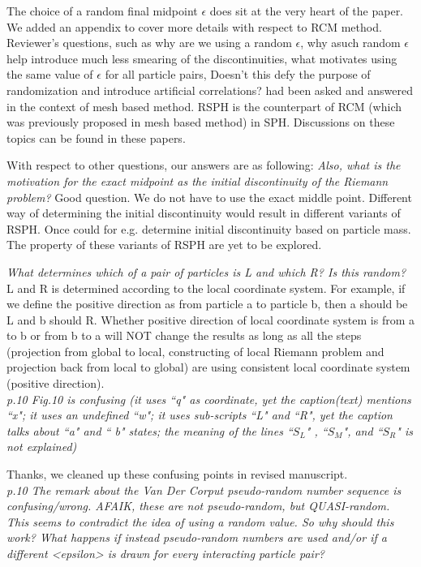 \documentclass[10pt,a4paper]{article}
\begin{document}
The choice of a random final midpoint $\epsilon$ does sit at the very heart of the paper. We added an appendix to cover more details with respect to RCM method. Reviewer's questions, such as why are we using a random $\epsilon$, why asuch random $\epsilon$ help introduce much less smearing of the discontinuities, what motivates using the same value of $\epsilon$ for all particle pairs, Doesn't this defy the purpose of randomization and introduce artificial correlations? had been asked and answered in the context of mesh based method. RSPH is the counterpart of RCM (which was previously proposed in mesh based method) in SPH. Discussions on these topics can be found in these papers. 

With respect to other questions, our answers are as following: 
\textit{Also, what is the motivation for the exact midpoint as the initial discontinuity of the Riemann problem?}
Good question. We do not have to use the exact middle point. Different way of determining the initial discontinuity would result in different variants of RSPH. Once could for e.g. determine initial discontinuity based on particle mass. The property of these variants of RSPH are yet to be explored. 

\textit{ What determines which of a pair of particles is L and which R? Is this random? }
L and R is determined according to the local coordinate system. For example, if we define the positive direction as from particle a to particle b, then a should be L and b should R. Whether positive direction of local coordinate system is from a to b or from b to a will NOT change the results as long as all the steps (projection from global to local, constructing of local Riemann problem and projection back from local to global) are using consistent local coordinate system (positive direction).
\\[3pt]


\textit{p.10 Fig.10 is confusing (it uses ``q" as coordinate, yet the caption(text) mentions ``x"; it uses an undefined ``w"; it uses sub-scripts ``L" and ``R", yet the caption talks about ``a" and `` b" states; the meaning of the lines ``$S_L$" , ``$S_M$", and ``$S_R$" is not explained)}

Thanks, we cleaned up these confusing points in revised manuscript.
\\[3pt]

\textit{p.10 The remark about the Van Der Corput pseudo-random number sequence is confusing/wrong. AFAIK, these are not pseudo-random, but QUASI-random. This seems to contradict the idea of using a random value. So why should this work?
What happens if instead pseudo-random numbers are used and/or if a different <epsilon> is drawn for every interacting particle pair?}
\end{document}
